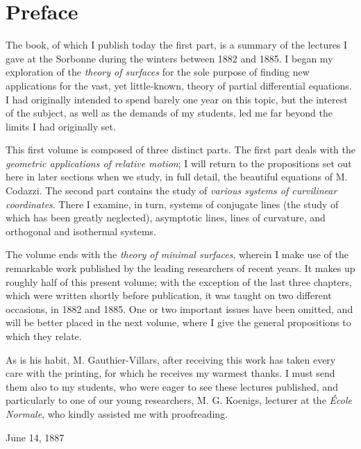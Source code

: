 \documentclass{letter}
\newcommand{\tmtextit}[1]{{\itshape{#1}}}
\begin{document}
\chapter*{Preface}

The book, of which I publish today the first part, is a summary of the
lectures I gave at the Sorbonne during the winters between 1882 and 1885. I
began my exploration of the \tmtextit{theory of surfaces} for the sole purpose
of finding new applications for the vast, yet little-known, theory of partial
differential equations. I had originally intended to spend barely one year on
this topic, but the interest of the subject, as well as the demands of my
students, led me far beyond the limits I had originally set.

This first volume is composed of three distinct parts. The first part deals
with the \tmtextit{geometric applications of relative motion}; I will return
to the propositions set out here in later sections when we study, in full
detail, the beautiful equations of M. Codazzi. The second part contains the
study of \tmtextit{various systems of curvilinear coordinates}. There I
examine, in turn, systems of conjugate lines (the study of which has been
greatly neglected), asymptotic lines, lines of curvature, and orthogonal and
isothermal systems.

The volume ends with the \tmtextit{theory of minimal surfaces}, wherein I make
use of the remarkable work published by the leading researchers of recent
years. It makes up roughly half of this present volume; with the exception of
the last three chapters, which were written shortly before publication, it was
taught on two different occasions, in 1882 and 1885. One or two important
issues have been omitted, and will be better placed in the next volume, where
I give the general propositions to which they relate.

As is his habit, M. Gauthier-Villars, after receiving this work has taken
every care with the printing, for which he receives my warmest thanks. I must
send them also to my students, who were eager to see these lectures published,
and particularly to one of our young researchers, M. G. Koenigs, lecturer at
the \tmtextit{\'Ecole Normale}, who kindly assisted me with proofreading.

\begin{flushright}
  {\small{June{\small{}} 14, 1887}}
\end{flushright}
\end{document}
